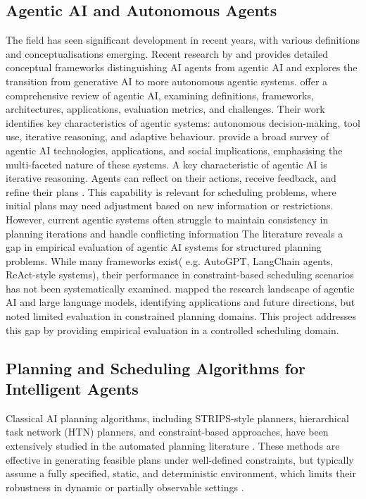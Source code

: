 \documentclass[12pt]{article}
\begin{document}
\subsection{Agentic AI and Autonomous Agents}
The field has seen significant development in recent years, with various definitions and conceptualisations emerging. Recent research by \textcite{sapkota2025ai} and \textcite{schneider2025generative} provides detailed conceptual frameworks distinguishing AI agents from agentic AI and explores the transition from generative AI to more autonomous agentic systems.
\textcite{bandi2025rise} offer a comprehensive review of agentic AI, examining definitions, frameworks, architectures, applications, evaluation metrics, and challenges. Their work identifies key characteristics of agentic systems: autonomous decision-making, tool use, iterative reasoning, and adaptive behaviour. \textcite{pati2025agentic} provide a broad survey of agentic AI technologies, applications, and social implications, emphasising the multi-faceted nature of these systems.
A key characteristic of agentic AI is iterative reasoning. Agents can reflect on their actions, receive feedback, and refine their plans \parencite{wang2024survey}. This capability is relevant for scheduling problems, where initial plans may need adjustment based on new information or restrictions. However, current agentic systems often struggle to maintain consistency in planning iterations and handle conflicting information \parencite{murugesan2025rise}
The literature reveals a gap in empirical evaluation of agentic AI systems for structured planning problems. While many frameworks exist( e.g. AutoGPT, LangChain agents, ReAct-style systems), their performance in constraint-based scheduling scenarios has not been systematically examined. \parencite{brohi2025research} mapped the research landscape of agentic AI and large language models, identifying applications and future directions, but noted limited evaluation in constrained planning domains. This project addresses this gap by providing empirical evaluation in a controlled scheduling domain.
\subsection{Planning and Scheduling Algorithms for Intelligent Agents}
Classical AI planning algorithms, including STRIPS-style planners, hierarchical task network (HTN) planners, and constraint-based approaches, have been extensively studied in the automated planning literature \parencite{geffner2013concise,ghallab2016automated}. These methods are effective in generating feasible plans under well-defined constraints, but typically assume a fully specified, static, and deterministic environment, which limits their robustness in dynamic or partially observable settings \parencite{novak2011agents,bidoux2017use}.
\end{document}
